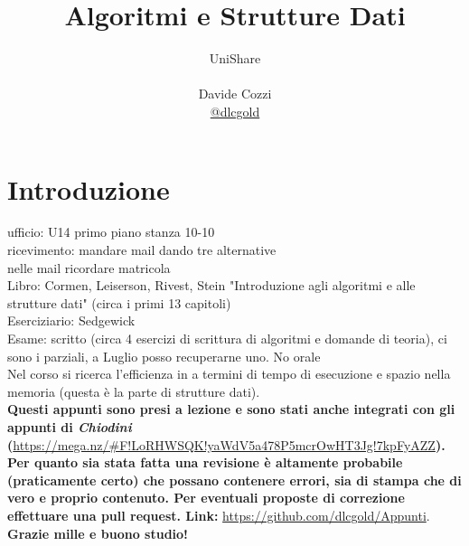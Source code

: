 \documentclass[a4paper,12pt,oneside,tikz]{book}
\title{Algoritmi e Strutture Dati}
\author{UniShare\\\\Davide Cozzi\\\href{https://t.me/dlcgold}{@dlcgold}\\}
\date{}
\begin{document}
\maketitle


\newtheorem{teorema}{Teorema}
\newtheorem{definizione}{Definizione}
\newtheorem{esempio}{Esempio}
\newtheorem{corollario}{Corollario}
\newtheorem{lemma}{Lemma}
\newtheorem{osservazione}{Osservazione}
\newtheorem{nota}{Nota}
\newtheorem{esercizio}{Esercizio}
\tableofcontents
\renewcommand{\chaptermark}[1]{%
	\markboth{\chaptername
		\ \thechapter.\ #1}{}}
\renewcommand{\sectionmark}[1]{\markright{\thesection.\ #1}}


\chapter{Introduzione}

ufficio: U14 primo piano stanza 10-10\\
ricevimento: mandare mail dando tre alternative\\
nelle mail ricordare matricola\\
Libro: Cormen, Leiserson, Rivest, Stein "Introduzione agli algoritmi e alle strutture dati" (circa i primi 13 capitoli)\\
Eserciziario: Sedgewick\\
Esame: scritto (circa 4 esercizi di scrittura di algoritmi e domande di teoria), ci sono i parziali, a Luglio posso recuperarne uno. No orale \\
Nel corso si ricerca l'efficienza in a termini di tempo di esecuzione e spazio nella memoria (questa è la parte di strutture dati).\\
\textbf{Questi appunti sono presi a lezione e sono stati anche integrati con gli appunti di \textit{Chiodini} (}\url{https://mega.nz/#F!LoRHWSQK!yaWdV5a478P5mcrOwHT3Jg!7kpFyAZZ}\textbf{). Per quanto sia stata fatta una revisione è altamente probabile (praticamente certo) che possano contenere errori, sia di stampa che di vero e proprio contenuto. Per eventuali proposte di correzione effettuare una pull request. Link: } \url{https://github.com/dlcgold/Appunti}.\\
\textbf{Grazie mille e buono studio!}
\end{document}

